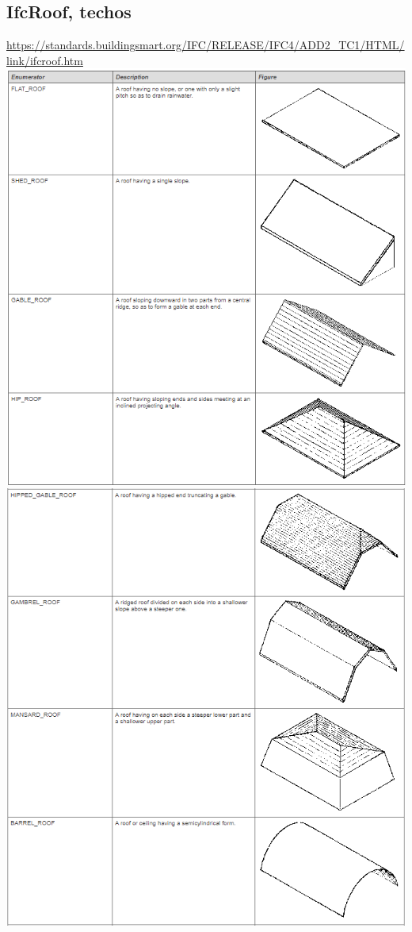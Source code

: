 \documentclass[spanish,12pt,a4paper,final,oneside]{book}
\begin{document}
\subsection{IfcRoof, techos}
\url{https://standards.buildingsmart.org/IFC/RELEASE/IFC4/ADD2_TC1/HTML/link/ifcroof.htm}
\\ \includegraphics[width=\textwidth]{Definicion de IfcRoofTypeEnum-1}
\\ \includegraphics[width=\textwidth]{Definicion de IfcRoofTypeEnum-2}
\end{document}
